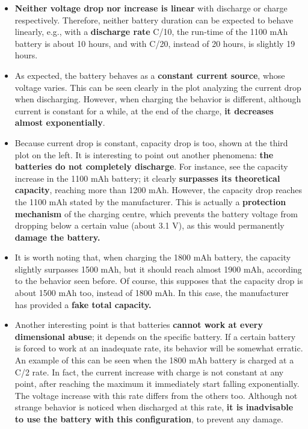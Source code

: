 \begin{itemize} [topsep=0pt]
	
	\item \textbf{Neither voltage drop nor increase is linear} with discharge or charge respectively. Therefore, neither battery duration can be expected to behave linearly, e.g., with a \textbf{discharge rate} C/10, the run-time of the 1100 mAh battery is about 10 hours, and with C/20, instead of 20 hours, is slightly 19 hours.
	\item As expected, the battery behaves as a \textbf{constant current source}, whose voltage varies. This can be seen clearly in the plot analyzing the current drop when discharging. However, when charging the behavior is different, although current is constant for a while, at the end of the charge, \textbf{it decreases almost exponentially}.
	\item Because current drop is constant, capacity drop is too, shown at the third plot on the left. It is interesting to point out another phenomena: \textbf{the batteries do not completely discharge}. For instance, see the capacity increase in the 1100 mAh battery; it clearly \textbf{surpasses its theoretical capacity}, reaching more than 1200 mAh. However, the capacity drop reaches the 1100 mAh stated by the manufacturer. This is actually a \textbf{protection mechanism} of the charging centre, which prevents the battery voltage from dropping below a certain value (about 3.1 V), as this would permanently \textbf{damage the battery.}
	\item It is worth noting that, when charging the 1800 mAh battery, the capacity slightly surpasses 1500 mAh, but it should reach almost 1900 mAh, according to the behavior seen before. Of course, this supposes that the capacity drop is about 1500 mAh too, instead of 1800 mAh. In this case, the manufacturer has provided a \textbf{fake total capacity.}
	\item Another interesting point is that batteries \textbf{cannot work at every dimensional abuse}; it depends on the specific battery. If a certain battery is forced to work at an inadequate rate, its behavior will be somewhat erratic. An example of this can be seen when the 1800 mAh battery is charged at a C/2 rate. In fact, the current increase with charge is not constant at any point, after reaching the maximum it immediately start falling exponentially. The voltage increase with this rate differs from the others too. Although not strange behavior is noticed when discharged at this rate,\textbf{ it is inadvisable to use the battery with this configuration}, to prevent any damage.
\end{itemize}


